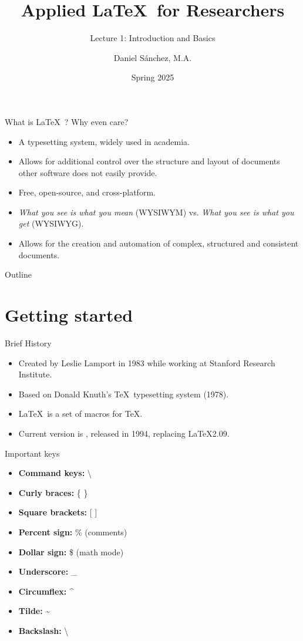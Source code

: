 \documentclass[t,12pt,xcolor=dvipsnames]{beamer}
\title[Applied \LaTeX]{Applied \LaTeX \ for Researchers}
\subtitle{Lecture 1: Introduction and Basics}
\author{Daniel Sánchez, M.A.}
\institute[LIDE]{Laboratorio de Investigación para el Desarrollo del Ecuador}
\date{Spring 2025}
\begin{document}
\begin{frame}
    \titlepage
\end{frame}



\begin{frame}{What is \LaTeX \ ? Why even care?}
    \begin{itemize}
    \item A typesetting system, widely used in academia.
    \item Allows for additional control over the structure and layout of documents other software does not easily provide.
    \item Free, open-source, and cross-platform.
    \item \textit{What you see is what you mean} (WYSIWYM) vs. \textit{What you see is what you get} (WYSIWYG). %
    \item Allows for the creation and automation of complex, structured and consistent documents.
    \end{itemize}
\end{frame}

\begin{frame}{Outline}
    \tableofcontents
\end{frame}

\section{Getting started}

\begin{frame}{Brief History}
    \begin{itemize}
        \item Created by Leslie Lamport in 1983 while working at Stanford Research Institute.
        \item Based on Donald Knuth's \TeX \ typesetting system (1978).
        \item \LaTeX \ is a set of macros for \TeX.
        \item Current version is \LaTeXe, released in 1994, replacing \LaTeX 2.09.
    \end{itemize}
\end{frame}

\begin{frame}{Important keys}
    \begin{itemize}
        \item \textbf{Command keys:} \textbackslash
        \item \textbf{Curly braces:} \{ \}
        \item \textbf{Square brackets:} [ ]
        \item \textbf{Percent sign:} \% (comments)
        \item \textbf{Dollar sign:} \$ (math mode)
        \item \textbf{Underscore:} \_
        \item \textbf{Circumflex:} \^{}
        \item \textbf{Tilde:} \~{}
        \item \textbf{Backslash:} \textbackslash
\end{itemize}
\end{frame}
\end{document}
